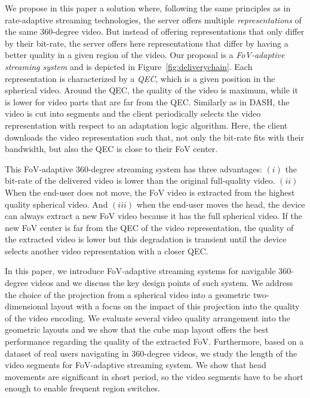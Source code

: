 We propose in this paper a solution where, following the same principles as in
rate-adaptive streaming technologies, the server offers multiple \emph{representations}
of the same 360-degree video. But instead of offering representations that only differ by
their bit-rate, the server offers here representations that differ by 
having a better quality in a given region of the video.
Our proposal is a \emph{FoV-adaptive streaming system} and is depicted in Figure~\ref{fig:deliverychain}.
Each representation is characterized by a \emph{\ac{QEC}}, which is a given
position in the spherical video. Around the \ac{QEC}, the quality of the video is maximum,
while it is lower for video parts that are far from the \ac{QEC}. Similarly as
in \ac{DASH}, the video is cut into segments and the client periodically selects
the video representation with respect to an adaptation logic algorithm. Here, the client downloads
the video representation such that, not only the bit-rate fits with their bandwidth, but also
the \ac{QEC} is close to their \ac{FoV} center.



This \ac{FoV}-adaptive 360-degree streaming system has three advantages:
$(i)$ the bit-rate of the delivered video is lower than the original full-quality video.
$(ii)$ When the end-user does not move, the \ac{FoV} video is extracted from the highest
quality spherical video.
And $(iii)$ when the end-user moves the head, the device can
always extract
a new \ac{FoV} video because it has the full spherical video. If the
new \ac{FoV} center is far from the
\ac{QEC} of the video representation, the quality of the extracted video is lower but this
degradation is transient until the
device selects another video representation with a closer \ac{QEC}.

In this paper, we introduce \ac{FoV}-adaptive streaming systems for navigable 360-degree
videos and we discuss the key design points of such system. We address
the choice of the projection from a spherical video into a geometric two-dimensional layout
with a focus on the impact of this projection into the quality of the video encoding. We evaluate
several video quality arrangement into the geometric layouts and we show that the
cube map layout offers the best performance regarding the quality of the extracted
\ac{FoV}.
Furthermore, based on a dataset of
real users navigating in 360-degree videos, we study the length of the video segments
for \ac{FoV}-adaptive streaming system. We show that head movements are significant
in short period, so the video segments have to be short enough to enable
frequent region switches.

